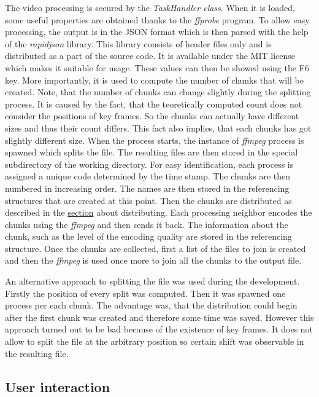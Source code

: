 The video processing is secured by the \textit{TaskHandler class}. When
it is loaded, some useful properties are obtained thanks to the
\textit{ffprobe} program. To allow easy processing, the output is in the
JSON format which is then parsed with the help of the \textit{rapidjson}
library. This library consists of header files only and is distributed
as a part of the source code. It is available under the MIT license
which makes it suitable for usage. These values can then be showed using
the F6 key. More importantly, it is used to compute the number of chunks
that will be created. Note, that the number of chunks can change
slightly during the splitting process. It is caused by the fact, that
the teoretically computed count does not consider the positions of key
frames. So the chunks can actually have different sizes and thus their
count differs. This fact also implies, that each chunks has got slightly
different size. When the process starts, the instance of \textit{ffmpeg}
process is spawned which splits the file. The resulting files are then
stored in the special subdirectory of the working directory. For easy
identification, each process is assigned a unique code determined by the
time stamp. The chunks are then numbered in increasing order. The names
are then stored in the referencing structures that are created at this
point. Then the chunks are distributed as described in the
\hyperref[distribution-of-chunks]{section} about distributing. Each
processing neighbor encodes the chunks using the \textit{ffmpeg} and
then sends it back. The information about the chunk, such as the level
of the encoding quality are stored in the referencing structure. Once
the chunks are collected, first a list of the files to join is created
and then the \textit{ffmpeg} is used once more to join all the chunks to
the output file.

An alternative approach to splitting the file was used during the
development. Firstly the position of every split was computed. Then it
was spawned one process per each chunk. The advantage was, that the
distribution could begin after the first chunk was created and therefore
some time was saved. However this approach turned out to be bad because
of the existence of key frames. It does not allow to split the file at
the arbitrary position so certain shift was observable in the resulting
file.

\subsection*{User interaction}

